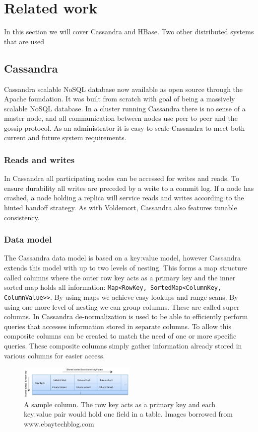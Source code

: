 \section{Related work}
In this section we will cover Cassandra and HBase. Two other distributed systems that are used 

\subsection{Cassandra}
Cassandra scalable NoSQL database now available as open source through the Apache foundation. It was built from scratch with goal of being a massively scalable NoSQL database. In a cluster running Cassandra there is no sense of a master node, and all communication between nodes use peer to peer and the gossip protocol. As an administrator it is easy to scale Cassandra to meet both current and future system requirements. 

\subsubsection{Reads and writes}
In Cassandra all participating nodes can be accessed for writes and reads. To ensure durability all writes are preceded by a write to a commit log. If a node has crashed, a node holding a replica will service reads and writes according to the hinted handoff strategy. As with Voldemort, Cassandra also features tunable consistency. 

\subsubsection{Data model}
The Cassandra data model is based on a key:value model, however Cassandra extends this model with up to two levels of nesting. This forms a map structure called columns where the outer row key acts as a primary key and the inner sorted map holds all information: \texttt{Map<RowKey, SortedMap<ColumnKey, ColumnValue>>}. By using maps we achieve easy lookups and range scans. By using one more level of nesting we can group columns. These are called super columns. In Cassandra de-normalization is used to be able to efficiently perform queries that accesses information stored in separate columns. To allow this composite columns can be created to match the need of one or more specific queries. These composite columns simply gather information already stored in various columns for easier access. 

\begin{figure}[h]
    \centering
    \includegraphics[width=0.5\textwidth]{resources/cas_col.png}
    \caption{A sample column. The row key acts as a primary key and each key:value pair would hold one field in a table. Images borrowed from www.ebaytechblog.com}
    \label{fig:sample_col}
\end{figure}

